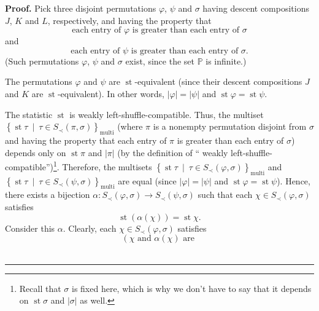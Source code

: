 \documentclass[numbers=enddot,12pt,final,onecolumn,notitlepage]{scrartcl}%
\theoremstyle{definition}
\newenvironment{proof}[1][Proof]{\noindent\textbf{#1.} }{\ \rule{0.5em}{0.5em}}
\newenvironment{verlong}{}{}
\begin{document}
\begin{verlong}
\begin{proof}
Pick three disjoint permutations $\varphi$, $\psi$ and $\sigma$ having descent
compositions $J$, $K$ and $L$, respectively, and having the property that%
\[
\text{each entry of }\varphi\text{ is greater than each entry of }\sigma
\]
and%
\[
\text{each entry of }\psi\text{ is greater than each entry of }\sigma\text{.}%
\]
(Such permutations $\varphi$, $\psi$ and $\sigma$ exist, since the set
$\mathbb{P}$ is infinite.)

The permutations $\varphi$ and $\psi$ are $\operatorname{st}$-equivalent
(since their descent compositions $J$ and $K$ are $\operatorname{st}%
$-equivalent). In other words, $\left\vert \varphi\right\vert =\left\vert
\psi\right\vert $ and $\operatorname{st} \varphi
=\operatorname{st} \psi$.

The statistic $\operatorname{st}$ is weakly left-shuffle-compatible. Thus,
the multiset\newline$\left\{  \operatorname{st} \tau 
\ \mid\ \tau\in S_{\prec}\left(  \pi,\sigma\right)  \right\}
_{\operatorname*{multi}}$ (where $\pi$ is a nonempty permutation disjoint from
$\sigma$ and having the property that each entry of $\pi$ is greater than each
entry of $\sigma$) depends only on $\operatorname{st} \pi   $
and $\left\vert \pi\right\vert $ (by the definition of \textquotedblleft
weakly left-shuffle-compatible\textquotedblright)\footnote{Recall that
$\sigma$ is fixed here, which is why we don't have to say that it depends on
$\operatorname{st} \sigma   $ and $\left\vert \sigma\right\vert
$ as well.}. Therefore, the multisets $\left\{  \operatorname{st} \tau
\ \mid\ \tau\in S_{\prec}\left(  \varphi,\sigma\right)  \right\}
_{\operatorname*{multi}}$ and \newline$\left\{  \operatorname{st} \tau
\ \mid\ \tau\in S_{\prec}\left(  \psi,\sigma\right)  \right\}
_{\operatorname*{multi}}$ are equal (since $\left\vert \varphi\right\vert
=\left\vert \psi\right\vert $ and $\operatorname{st} \varphi
=\operatorname{st} \psi$). Hence, there exists a bijection
$\alpha:S_{\prec}\left(  \varphi,\sigma\right)  \rightarrow S_{\prec}\left(
\psi,\sigma\right)  $ such that each $\chi\in S_{\prec}\left(  \varphi
,\sigma\right)  $ satisfies%
\begin{equation}
\operatorname{st}\left(  \alpha\left(  \chi\right)  \right)
=\operatorname{st} \chi
. \label{pf.thm.dendri.K.ideal.alpha}
\end{equation}
Consider this $\alpha$. Clearly, each $\chi\in S_{\prec}\left(  \varphi
,\sigma\right)  $ satisfies%
\[
\left(  \chi\text{ and }\alpha\left(  \chi\right)  \text{ are }%
\]
\end{proof}
\end{verlong}
\end{document}
